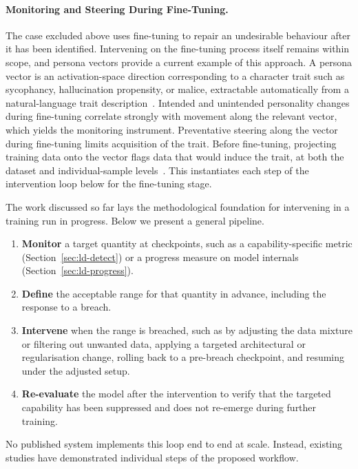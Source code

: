 \paragraph{Monitoring and Steering During Fine-Tuning.} The case excluded above uses fine-tuning to repair an undesirable behaviour after it has been identified. Intervening on the fine-tuning process itself remains within scope, and persona vectors provide a current example of this approach. A persona vector is an activation-space direction corresponding to a character trait such as sycophancy, hallucination propensity, or malice, extractable automatically from a natural-language trait description~. Intended and unintended personality changes during fine-tuning correlate strongly with movement along the relevant vector, which yields the monitoring instrument. Preventative steering along the vector during fine-tuning limits acquisition of the trait. Before fine-tuning, projecting training data onto the vector flags data that would induce the trait, at both the dataset and individual-sample levels~. This instantiates each step of the intervention loop below for the fine-tuning stage.

\begin{practicebox}
The work discussed so far lays the methodological foundation for intervening in a training run in progress. Below we present a general pipeline.

\begin{enumerate}[nosep]
   \item \textbf{Monitor} a target quantity at checkpoints, such as a capability-specific metric (Section~\ref{sec:ld-detect}) or a progress measure on model internals (Section~\ref{sec:ld-progress}).
   \item \textbf{Define} the acceptable range for that quantity in advance, including the response to a breach.
   \item \textbf{Intervene} when the range is breached, such as by adjusting the data mixture or filtering out unwanted data, applying a targeted architectural or regularisation change, rolling back to a pre-breach checkpoint, and resuming under the adjusted setup.
   \item \textbf{Re-evaluate} the model after the intervention to verify that the targeted capability has been suppressed and does not re-emerge during further training.
\end{enumerate}
No published system implements this loop end to end at scale. Instead, existing studies have demonstrated individual steps of the proposed workflow.
\end{practicebox}

